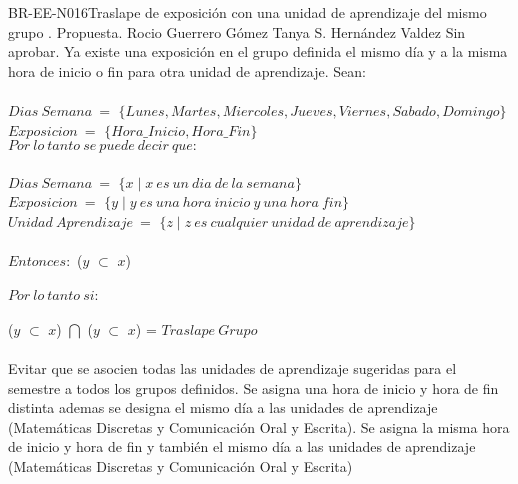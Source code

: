 \begin{BusinessRule}{BR-EE-N016}{Traslape de exposición con una unidad de aprendizaje del mismo grupo}
	{\bcCondition}    %
	{\btEnabler}     %
	{\blControlling}    %
	.
	\BRItem[Estado] Propuesta.
	 Rocio Guerrero Gómez
	 Tanya S. Hernández Valdez
	 Sin aprobar.
	\BRItem[Descripción] Ya existe una exposición en el grupo definida el mismo día y a la misma hora de inicio o fin para otra unidad de aprendizaje.
	\BRItem[Sentencia] Sean: \\\\
	$Dias\ Semana\ =$ $\{Lunes, Martes, Miercoles, Jueves, Viernes, Sabado, Domingo\}$ \\
	$Exposicion\ =$ $\{Hora\_Inicio, Hora\_Fin\}$ \\
	$Por\ lo\ tanto\ se\ puede\ decir\ que:$ \\\\
	$Dias\ Semana\ =$ $\{x \mid x\ es\ un\ dia\ de\ la\ semana\}$\\
	$Exposicion\ =$ $\{y \mid y\ es\ una\ hora\ inicio\ y\ una\ hora\ fin\}$ \\
	$Unidad\ Aprendizaje\ =$ $\{z \mid z\ es\ cualquier\ unidad\ de\ aprendizaje\}$ \\\\
	$Entonces:$ ($y$ $\subset$ $x$) \\\\
	$Por\ lo\ tanto\ si:$\\\\
	($y$ $\subset$ $x$) $\bigcap$ ($y$ $\subset$ $x$) = $Traslape\ Grupo$ \\\\
	\BRItem[Motivación] Evitar que se asocien todas las unidades de aprendizaje sugeridas para el semestre a todos los grupos definidos.
	 \cdtEmpty
		Se asigna una hora de inicio y hora de fin distinta ademas se designa el mismo día a las unidades de aprendizaje (Matemáticas Discretas y Comunicación Oral y Escrita).
	 \cdtEmpty
		Se asigna la misma hora de inicio y hora de fin y también el mismo día a las unidades de aprendizaje (Matemáticas Discretas y Comunicación Oral y Escrita) 
\end{BusinessRule}

